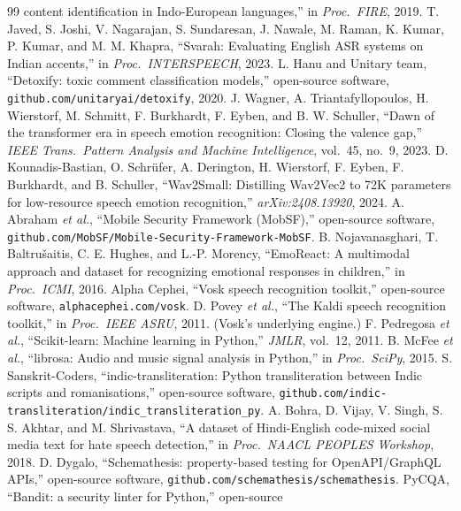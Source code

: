 \documentclass[11pt,a4paper]{article}
\begin{document}
\begin{thebibliography}{99}
content identification in Indo-European languages,'' in \emph{Proc.\ FIRE}, 2019.
 T. Javed, S. Joshi, V. Nagarajan, S. Sundaresan, J. Nawale,
M. Raman, K. Kumar, P. Kumar, and M. M. Khapra, ``Svarah: Evaluating English ASR
systems on Indian accents,'' in \emph{Proc.\ INTERSPEECH}, 2023.
 L. Hanu and Unitary team, ``Detoxify: toxic comment
classification models,'' open-source software,
\texttt{github.com/unitaryai/detoxify}, 2020.
 J. Wagner, A. Triantafyllopoulos, H. Wierstorf, M. Schmitt,
F. Burkhardt, F. Eyben, and B. W. Schuller, ``Dawn of the transformer era in speech
emotion recognition: Closing the valence gap,'' \emph{IEEE Trans.\ Pattern Analysis
and Machine Intelligence}, vol.~45, no.~9, 2023.
 D. Kounadis-Bastian, O. Schr\"ufer, A. Derington,
H. Wierstorf, F. Eyben, F. Burkhardt, and B. Schuller, ``Wav2Small: Distilling
Wav2Vec2 to 72K parameters for low-resource speech emotion recognition,''
\emph{arXiv:2408.13920}, 2024.
 A. Abraham \emph{et al.}, ``Mobile Security Framework (MobSF),''
open-source software, \texttt{github.com/MobSF/Mobile-Security-Framework-MobSF}.
 B. Nojavanasghari, T. Baltru\v{s}aitis, C. E. Hughes, and
L.-P. Morency, ``EmoReact: A multimodal approach and dataset for recognizing
emotional responses in children,'' in \emph{Proc.\ ICMI}, 2016.
 Alpha Cephei, ``Vosk speech recognition toolkit,'' open-source
software, \texttt{alphacephei.com/vosk}.
 D. Povey \emph{et al.}, ``The Kaldi speech recognition
toolkit,'' in \emph{Proc.\ IEEE ASRU}, 2011. (Vosk's underlying engine.)
 F. Pedregosa \emph{et al.}, ``Scikit-learn: Machine
learning in Python,'' \emph{JMLR}, vol.~12, 2011.
 B. McFee \emph{et al.}, ``librosa: Audio and music signal
analysis in Python,'' in \emph{Proc.\ SciPy}, 2015.
 S. Sanskrit-Coders, ``indic-transliteration: Python
transliteration between Indic scripts and romanisations,'' open-source software,
\texttt{github.com/indic-transliteration/indic\_transliteration\_py}.
 A. Bohra, D. Vijay, V. Singh, S. S. Akhtar, and M. Shrivastava,
``A dataset of Hindi-English code-mixed social media text for hate speech
detection,'' in \emph{Proc.\ NAACL PEOPLES Workshop}, 2018.
 D. Dygalo, ``Schemathesis: property-based testing for
OpenAPI/GraphQL APIs,'' open-source software,
\texttt{github.com/schemathesis/schemathesis}.
 PyCQA, ``Bandit: a security linter for Python,'' open-source

\end{thebibliography}
\end{document}
